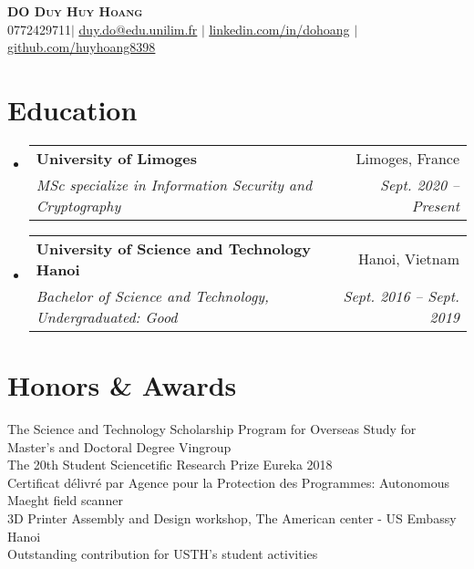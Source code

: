 \documentclass[letterpaper,11pt]{article}
\makeatletter
\newcommand{\resumeSubheading}[4]{
  \vspace{-2pt}\item
    \begin{tabular*}{0.97\textwidth}[t]{l@{\extracolsep{\fill}}r}
      \textbf{#1} & #2 \\
      \textit{\small#3} & \textit{\small #4} \\
    \end{tabular*}\vspace{-7pt}
}
\newcommand{\resumeSubHeadingListStart}{\begin{itemize}[leftmargin=0.15in, label={}]}
\newcommand{\resumeSubHeadingListEnd}{\end{itemize}}
\makeatother
\begin{document}

\begin{center}
    \textbf{\Huge \scshape DO Duy Huy Hoang} \\ \vspace{1pt}
    \small 0772429711$|$ \href{mailto:duy.do@etu.unilim.fr}{\underline{duy.do@edu.unilim.fr}} $|$ 
    \href{https://linkedin.com/in/dohoang}{\underline{linkedin.com/in/dohoang}} $|$
    \href{https://github.com/huyhoang8398}{\underline{github.com/huyhoang8398}}
\end{center}

\section{Education}
  \resumeSubHeadingListStart
    \resumeSubheading
      {University of Limoges}{Limoges, France}
      {MSc specialize in Information Security and Cryptography}{Sept. 2020 -- Present}
    \resumeSubheading
      {University of Science and Technology Hanoi}{Hanoi, Vietnam}
      {Bachelor of Science and Technology, Undergraduated: Good}{Sept. 2016 -- Sept. 2019}
  \resumeSubHeadingListEnd

\section{Honors \& Awards}
 \begin{itemize}[leftmargin=0.15in, label={}]
    \small{\item{
      {The Science and Technology Scholarship Program for Overseas Study for Master's and Doctoral Degree Vingroup}\\
      {The 20th Student Sciencetific Research Prize Eureka 2018}\\
      {Certificat délivré par Agence pour la Protection des Programmes: Autonomous Maeght field scanner}\\
      {3D Printer Assembly and Design workshop, The American center - US Embassy Hanoi}\\
      {Outstanding contribution for USTH's student activities}
    }}
 \end{itemize}
\end{document}
